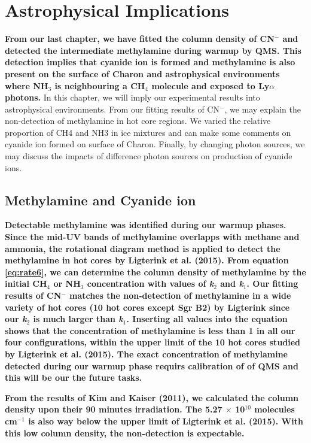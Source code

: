 \chapter{\protect Astrophysical Implications}
\label{astron}

\textbf{From our last chapter, we have fitted the column density of CN$^-$ and detected the intermediate methylamine during warmup by QMS. This detection implies that cyanide ion is formed and methylamine is also present on the surface of Charon and astrophysical environments where NH$_3$ is neighbouring a CH$_4$ molecule and exposed to Ly$\alpha$ photons.} In this chapter, we will imply our experimental results into astrophysical environments. From our fitting results of CN$^-$, we may explain the non-detection of methylamine in hot core regions. We varied the relative proportion of CH4 and NH3 in ice mixtures and can make some comments on cyanide ion formed on surface of Charon. Finally, by changing photon sources, we may discuss the impacts of difference photon sources on production of cyanide ions.

\section {Methylamine and Cyanide ion}

\textbf{Detectable methylamine was identified during our warmup phases. Since the mid-UV bands of methylamine overlapps with methane and ammonia, the rotational diagram method is applied to detect the methylamine in hot cores by Ligterink et al. (2015)\cite{ligterink2015search}. From equation \ref{eq:rate6}, we can determine the column density of methylamine by the initial CH$_4$ or NH$_3$ concentration with values of \textit{k$_2$} and \textit{k$_1$}. Our fitting results of CN$^-$ matches the non-detection of methylamine in a wide variety of hot cores (10 hot cores except Sgr B2) by Ligterink since our \textit{k$_2$} is much larger than \textit{k$_1$}. Inserting all values into the equation shows that the concentration of methylamine is less than 1 in all our four configurations, within the upper limit of the 10 hot cores studied by Ligterink et al. (2015)\cite{ligterink2015search}. The exact concentration of methylamine detected during our warmup phase requirs calibration of of QMS and this will be our the future tasks.}

\textbf{From the results of Kim and Kaiser (2011)\cite{kim}, we calculated the column density upon their 90 minutes irradiation. The 5.27 $\times$ 10$^{10}$ molecules cm$^{-1}$ is also way below the upper limit of Ligterink et al. (2015)\cite{ligterink2015search}. With this low column density, the non-detection is expectable.}

